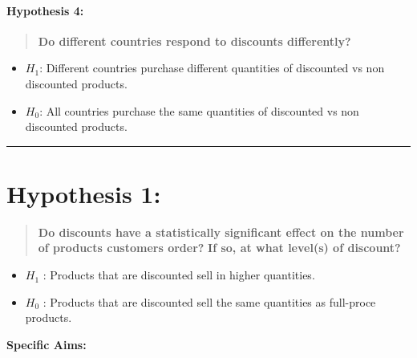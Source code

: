 \documentclass[11pt]{article}
\providecommand{\tightlist}{%
      \setlength{\itemsep}{0pt}\setlength{\parskip}{0pt}}
\begin{document}
\hypertarget{hypothesis-4}{%
\paragraph{Hypothesis 4:}\label{hypothesis-4}}

\begin{quote}
\textbf{Do different countries respond to discounts differently?}
\end{quote}

\begin{itemize}
\tightlist
\item
  \(H_1\): Different countries purchase different quantities of
  discounted vs non discounted products.
\item
  \(H_0\): All countries purchase the same quantities of discounted vs
  non discounted products. 
\end{itemize}

    \begin{center}\rule{0.5\linewidth}{\linethickness}\end{center}

\hypertarget{hypothesis-1}{%
\section{\texorpdfstring{\textbf{Hypothesis
1:}}{Hypothesis 1:}}\label{hypothesis-1}}

\begin{quote}
\textbf{Do discounts have a statistically significant effect on the
number of products customers order?} \textbf{If so, at what level(s) of
discount?}
\end{quote}

\begin{itemize}
\item
  \(H_1\) : Products that are discounted sell in higher quantities.
\item
  \(H_0\) : Products that are discounted sell the same quantities as
  full-proce products.
\end{itemize}

\textbf{Specific Aims:}
\end{document}
